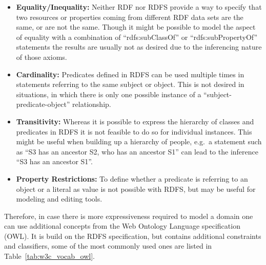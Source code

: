 \begin{itemize}
	\item \textbf{Equality/Inequality:} Neither \gls{RDF} nor \gls{RDFS} provide a way to specify that two resources or properties coming from different \gls{RDF} data sets are the same, or are not the same. Though it might be possible to model the aspect of equality with a combination of ``rdfs:subClassOf'' or ``rdfs:subPropertyOf'' statements the results are usually not as desired due to the inferencing nature of those axioms.
	\item \textbf{Cardinality:} Predicates defined in \gls{RDFS} can be used multiple times in statements referring to the same subject or object. This is not desired in situations, in which there is only one possible instance of a ``subject-predicate-object'' relationship.
	\item \textbf{Transitivity:} Whereas it is possible to express the hierarchy of classes and predicates in \gls{RDFS} it is not feasible to do so for individual instances. This might be useful when building up a hierarchy of people, e.g.\ a statement such as ``S3 has an ancestor S2, who has an ancestor S1'' can lead to the inference ``S3 has an ancestor S1''.
	\item \textbf{Property Restrictions:} To define whether a predicate is referring to an object or a literal as value is not possible with \gls{RDFS}, but may be useful for modeling and editing tools.
\end{itemize}

Therefore, in case there is more expressiveness required to model a domain one can use additional concepts from the Web Ontology Language specification (\gls{OWL}). It is build on the \gls{RDFS} specification, but contains additional constraints and classifiers, some of the most commonly used ones are listed in Table~\ref{tab:w3c_vocab_owl}. \@

